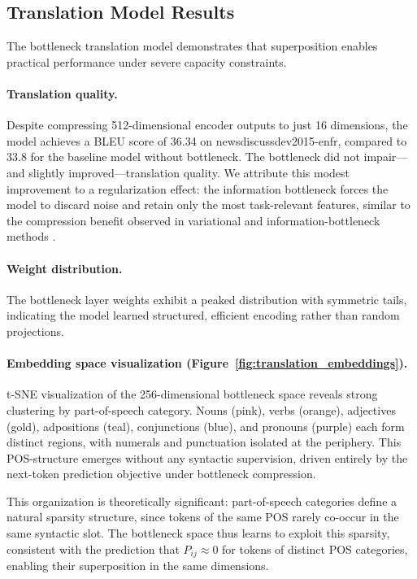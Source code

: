 \subsection{Translation Model Results}

The bottleneck translation model demonstrates that superposition enables practical performance under severe capacity constraints.

\paragraph{Translation quality.} Despite compressing 512-dimensional encoder outputs to just 16 dimensions, the model achieves a BLEU score of 36.34 on newsdiscussdev2015-enfr, compared to 33.8 for the baseline model without bottleneck. The bottleneck did not impair---and slightly improved---translation quality. We attribute this modest improvement to a regularization effect: the information bottleneck forces the model to discard noise and retain only the most task-relevant features, similar to the compression benefit observed in variational and information-bottleneck methods \citep{tishby2000information}.

\paragraph{Weight distribution.} The bottleneck layer weights exhibit a peaked distribution with symmetric tails, indicating the model learned structured, efficient encoding rather than random projections.

\paragraph{Embedding space visualization (Figure~\ref{fig:translation_embeddings}).} t-SNE visualization of the 256-dimensional bottleneck space reveals strong clustering by part-of-speech category. Nouns (pink), verbs (orange), adjectives (gold), adpositions (teal), conjunctions (blue), and pronouns (purple) each form distinct regions, with numerals and punctuation isolated at the periphery. This POS-structure emerges without any syntactic supervision, driven entirely by the next-token prediction objective under bottleneck compression.

This organization is theoretically significant: part-of-speech categories define a natural sparsity structure, since tokens of the same POS rarely co-occur in the same syntactic slot. The bottleneck space thus learns to exploit this sparsity, consistent with the prediction that $P_{ij} \approx 0$ for tokens of distinct POS categories, enabling their superposition in the same dimensions.

